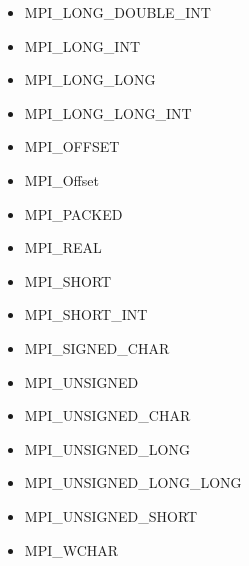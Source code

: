 \begin{multicols}{3}
\begin{itemize}
\item MPI_LONG_DOUBLE_INT~\pageref{def:MPI_LONG_DOUBLE_INT}
\item MPI_LONG_INT~\pageref{def:MPI_LONG_INT}
\item MPI_LONG_LONG~\pageref{def:MPI_LONG_LONG}
\item MPI_LONG_LONG_INT~\pageref{def:MPI_LONG_LONG_INT}
\item MPI_OFFSET~\pageref{def:MPI_OFFSET}
\item MPI_Offset~\pageref{def:MPI_Offset}
\item MPI_PACKED~\pageref{def:MPI_PACKED}
\item MPI_REAL~\pageref{def:MPI_REAL}
\item MPI_SHORT~\pageref{def:MPI_SHORT}
\item MPI_SHORT_INT~\pageref{def:MPI_SHORT_INT}
\item MPI_SIGNED_CHAR~\pageref{def:MPI_SIGNED_CHAR}
\item MPI_UNSIGNED~\pageref{def:MPI_UNSIGNED}
\item MPI_UNSIGNED_CHAR~\pageref{def:MPI_UNSIGNED_CHAR}
\item MPI_UNSIGNED_LONG~\pageref{def:MPI_UNSIGNED_LONG}
\item MPI_UNSIGNED_LONG_LONG~\pageref{def:MPI_UNSIGNED_LONG_LONG}
\item MPI_UNSIGNED_SHORT~\pageref{def:MPI_UNSIGNED_SHORT}
\item MPI_WCHAR~\pageref{def:MPI_WCHAR}
\end{itemize}
\end{multicols}
